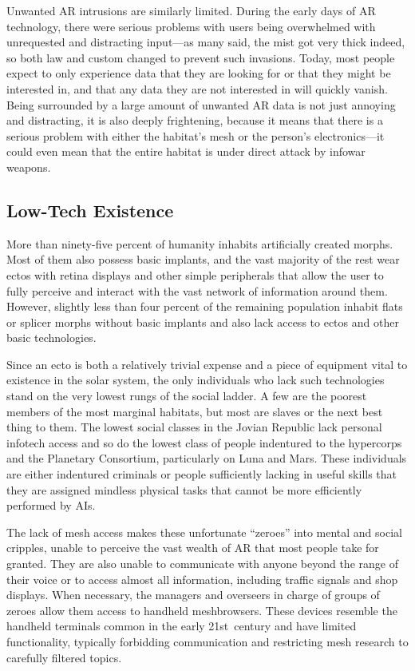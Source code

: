 Unwanted AR intrusions are similarly limited. 
During the early days of AR technology, there were 
serious problems with users being overwhelmed with 
unrequested and distracting input—as many said, the 
mist got very thick indeed, so both law and custom 
changed to prevent such invasions. Today, most people 
expect to only experience data that they are looking for 
or that they might be interested in, and that any data 
they are not interested in will quickly vanish. Being 
surrounded by a large amount of unwanted AR data 
is not just annoying and distracting, it is also deeply 
frightening, because it means that there is a serious 
problem with either the habitat's mesh or the person's 
electronics—it could even mean that the entire habitat 
is under direct attack by infowar weapons.

\subsection{Low-Tech Existence}

More than ninety-five percent of humanity inhabits 
artificially created morphs. Most of them also possess 
basic implants, and the vast majority of the rest wear 
ectos with retina displays and other simple peripherals that allow the user to fully perceive and interact 
with the vast network of information around them. 
However, slightly less than four percent of the remaining population inhabit flats or splicer morphs without 
basic implants and also lack access to ectos and other 
basic technologies.

Since an ecto is both a relatively trivial expense and 
a piece of equipment vital to existence in the solar 
system, the only individuals who lack such technologies stand on the very lowest rungs of the social ladder. 
A few are the poorest members of the most marginal 
habitats, but most are slaves or the next best thing to 
them. The lowest social classes in the Jovian Republic 
lack personal infotech access and so do the lowest 
class of people indentured to the hypercorps and the 
Planetary Consortium, particularly on Luna and Mars. 
These individuals are either indentured criminals or 
people sufficiently lacking in useful skills that they are 
assigned mindless physical tasks that cannot be more 
efficiently performed by AIs.

The lack of mesh access makes these unfortunate 
``zeroes'' into mental and social cripples, unable to perceive the vast wealth of AR that most people take for 
granted. They are also unable to communicate with 
anyone beyond the range of their voice or to access 
almost all information, including traffic signals and 
shop displays. When necessary, the managers and 
overseers in charge of groups of zeroes allow them 
access to handheld meshbrowsers. These devices resemble the handheld terminals common in the early 
21st century and have limited functionality, typically 
forbidding communication and restricting mesh research to carefully filtered topics. 


